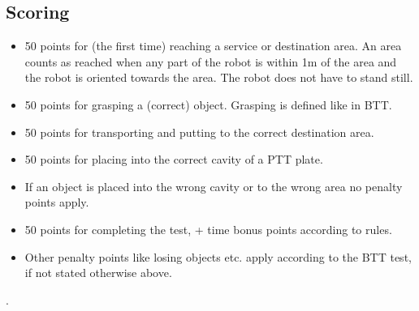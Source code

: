 		
\subsection{Scoring}

\begin{itemize}
\item 50 points for (the first time) reaching a service or destination area. An area counts as reached when any part of the robot is within 1m of the area and the robot is oriented towards the area. The robot does not have to stand still. 
\item 50 points for grasping a (correct) object. Grasping is defined like in BTT. 
\item 50 points for transporting and putting to the correct destination area. 
\item 50 points for placing into the correct cavity of a PTT plate. 
\item If an object is placed into the wrong cavity or to the wrong area no penalty points apply. 
\item 50 points for completing the test, + time bonus points according to rules.
\item Other penalty points like losing objects etc. apply according to the BTT test, if not stated otherwise above.
\end{itemize}

.

